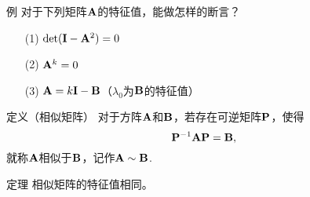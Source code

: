 \begin{frame}
  \begin{footnotesize}
    \begin{exampleblock}{例}
      对于下列矩阵$\mathbf{A}$的特征值，能做怎样的断言？
      \begin{itemize}
      \item[(1)] $\det(\mathbf{I}-\mathbf{A}^2)=0$
      \item[(2)] $\mathbf{A}^k=0$
      \item[(3)] $\mathbf{A}=k\mathbf{I}-\mathbf{B}$（$\lambda_0$为$\mathbf{B}$的特征值）
      \end{itemize}
    \end{exampleblock}
  \end{footnotesize}
\end{frame}


\begin{frame}
  \begin{footnotesize}
    \begin{block}{定义（相似矩阵）}
      对于方阵$\mathbf{A}$和$\mathbf{B}$，若存在可逆矩阵$\mathbf{P}$，使得
      $$
      \mathbf{P}^{-1}\mathbf{A}\mathbf{P}=\mathbf{B},
      $$
      就称$\mathbf{A}$相似于$\mathbf{B}$，记作$\mathbf{A}\sim\mathbf{B}$.
    \end{block}
     

%    
%
%
    \begin{block}{定理}
      相似矩阵的特征值相同。
    \end{block}
   
  \end{footnotesize}
\end{frame}



